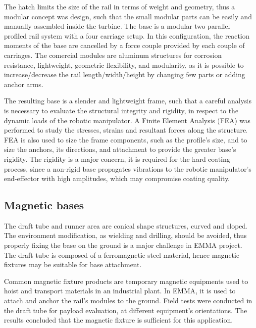 The hatch limits the size of the rail in terms of weight and geometry, thus a
modular concept was design, such that the small modular parts can be easily and manually assembled inside the
turbine. The base is a modular two parallel profiled rail system %
with a four carriage setup. In this configuration, the reaction moments of the
base are cancelled by a force couple provided by each couple of carriages. The
comercial modules are aluminum structures for corrosion resistance,
lightweight, geometric flexibility, and modularity, as it is possible to
increase/decrease the rail length/width/height by changing few parts or adding
anchor arms. %

The resulting base is a slender and lightweight frame, such that a careful
analysis is necessary to evaluate the structural integrity and rigidity, in
respect to the dynamic loads of the robotic manipulator. A Finite Element
Analysis (FEA) was performed to study the stresses, strains and resultant forces
along the structure. FEA is also used to size the frame components, such as
the profile's size, and to size the anchors, its directions, and attachment to
provide the greater base's rigidity. The rigidity is a major concern, it is
required for the hard coating process, since a non-rigid base propagates
vibrations to the robotic manipulator's end-effector with high amplitudes, which
may compromise coating quality.


\subsection{Magnetic bases}

The draft tube and runner area are conical shape structures, curved and
sloped. The environment modification, as wielding and drilling, should be
avoided, thus properly fixing the base on the ground is a major challenge in
EMMA project. The draft tube is composed of a ferromagnetic steel material,
hence magnetic fixtures may be suitable for base attachment. 

Common magnetic fixture products are temporary magnetic equipments used to hoist
and transport materials in an industrial plant. In EMMA, it is used to attach
and anchor the rail's modules to the ground. Field tests were conducted in the
draft tube for payload evaluation, at different equipment's orientations. The
results concluded that the magnetic fixture is sufficient for this application.


